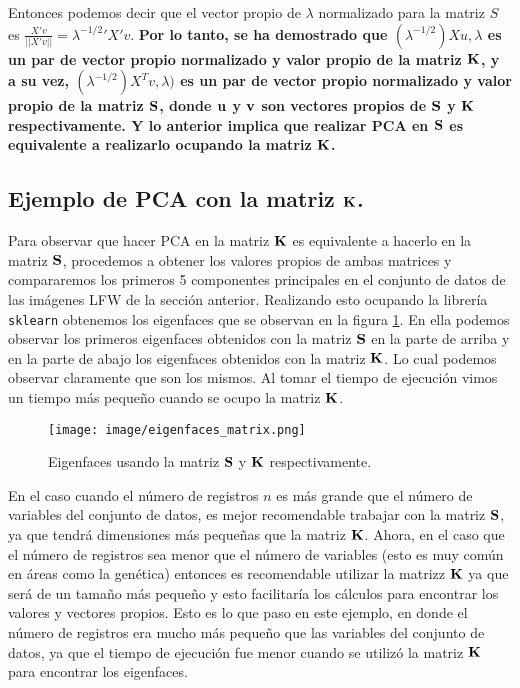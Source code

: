 \documentclass[paper=letter, fontsize=11pt]{scrartcl}
\numberwithin{equation}{section} %
\numberwithin{figure}{section} %
\numberwithin{table}{section} %
\begin{document}
Entonces podemos decir que el vector propio de $\lambda$ normalizado para la matriz $S$ es $\frac{X'v}{||X'v||}=\lambda^{-1/2}'X'v.$ \textbf{Por lo tanto, se ha demostrado que $(\lambda^{-1/2})Xu, \lambda$ es un par de vector propio normalizado y valor propio de la matriz $\bf K$, y a su vez, $(\lambda^{-1/2})X^Tv, \lambda)$ es un par de vector propio normalizado y valor propio de la matriz $\bf S$, donde $\bf u$ y $\bf v$ son vectores propios de $\bf S$ y $\bf K$ respectivamente. Y lo anterior implica que realizar PCA en $\bf S$ es equivalente a realizarlo ocupando la matriz $\bf K$.}


\subsection{Ejemplo de PCA con la matriz $\bf K$.}
Para observar que hacer PCA en la matriz $\bf K$ es equivalente a hacerlo en la matriz $\bf S$, procedemos a  obtener los valores propios de ambas matrices y compararemos los primeros 5 componentes principales en el conjunto de datos de las imágenes LFW de la sección anterior. Realizando esto ocupando la librería \texttt{sklearn} obtenemos los eigenfaces que se observan en la figura \ref{fig:eigenfaces_matrix}. En ella podemos observar los primeros eigenfaces obtenidos con la matriz $\bf S$ en la parte de arriba y en la parte de abajo los eigenfaces obtenidos con la matriz $\bf K$. Lo cual podemos observar claramente que son los mismos. Al tomar el tiempo de ejecución vimos un tiempo más pequeño cuando se ocupo la matriz $\bf K$.
\begin{figure}[H]
    \centering
    \texttt{[image: image/eigenfaces\_matrix.png]}
    \caption{Eigenfaces usando la matriz $\bf S$ y $\bf K$ respectivamente.}
    \label{fig:eigenfaces_matrix}
\end{figure}

En el caso cuando el número de registros $n$ es más grande que el número de variables del conjunto de datos, es mejor recomendable trabajar con la matriz $\bf S$, ya que tendrá dimensiones más pequeñas que la matriz $\bf K$. Ahora, en el caso que el número de registros sea menor que el número de variables (esto es muy común en áreas como la genética) entonces es recomendable utilizar la matrizz $\bf K$ ya que será de un tamaño más pequeño y esto facilitaría los cálculos para encontrar los valores y vectores propios. Esto es lo que paso en este ejemplo, en donde el número de registros era mucho más pequeño que las variables del conjunto de datos, ya que el tiempo de ejecución fue menor cuando se utilizó la matriz $\bf K$ para encontrar los eigenfaces.   
\end{document}
